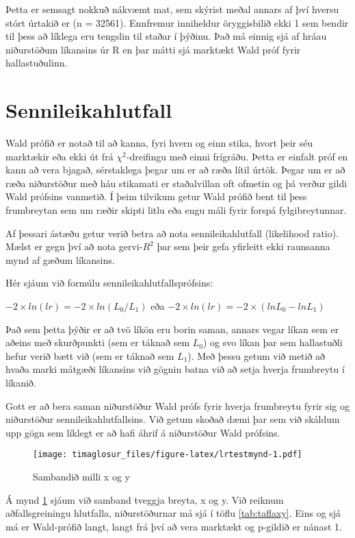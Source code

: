 \documentclass[]{book}
\begin{document}
Þetta er semsagt nokkuð nákvæmt mat, sem skýrist meðal annars af því hversu stórt úrtakið er (n = 32561). Ennfremur inniheldur öryggisbilið ekki 1 sem bendir til þess að líklega eru tengslin til staðar í þýðinu. Það má einnig sjá af hráau niðurstöðum líkansins úr R en þar mátti sjá marktækt Wald próf fyrir hallastuðulinn.

\hypertarget{sennileikahlutfall}{%
\section{Sennileikahlutfall}\label{sennileikahlutfall}}

Wald prófið er notað til að kanna, fyri hvern og einn stika, hvort þeir séu marktækir eða ekki út frá \(\chi^2\)-dreifingu með einni frígráðu. Þetta er einfalt próf en kann að vera bjagað, sérstaklega þegar um er að ræða lítil úrtök. Þegar um er að ræða niðurstöður með háu stikamati er staðalvillan oft ofmetin og þá verður gildi Wald prófsins vanmetið. Í þeim tilvikum getur Wald prófið bent til þess frumbreytan sem um ræðir skipti litlu eða engu máli fyrir forspá fylgibreytunnar.

Af þessari ástæðu getur verið betra að nota sennileikahlutfall (likelihood ratio). Mælst er gegn því að nota gervi-\(R^2\) þar sem þeir gefa yfirleitt ekki raunsanna mynd af gæðum líkansins.

Hér sjáum við formúlu sennileikahlutfallsprófsins:

\(-2 \times ln(lr) = -2\times ln({L_{0}}/{L_{1}} )\)
eða
\(-2 \times ln(lr) = -2\times (lnL_{0}-lnL_{1} )\)

Það sem þetta þýðir er að tvö líkön eru borin saman, annars vegar líkan sem er aðeins með skurðpunkti (sem er táknað sem \(L_0\)) og svo líkan þar sem hallastuðli hefur verið bætt við (sem er táknað sem \(L_1\)). Með þessu getum við metið að hvaða marki mátgæði líkansins við gögnin batna við að setja hverja frumbreytu í líkanið.

Gott er að bera saman niðurstöður Wald prófs fyrir hverja frumbreytu fyrir sig og niðurstöður sennileikahlutfallsins. Við getum skoðað dæmi þar sem við skáldum upp gögn sem líklegt er að hafi áhrif á niðurstöður Wald prófsins.

\begin{figure}
\centering
\texttt{[image: timaglosur\_files/figure-latex/lrtestmynd-1.pdf]}
\caption{\label{fig:lrtestmynd}Sambandið milli x og y}
\end{figure}

Á mynd \ref{fig:lrtestmynd} sjáum við samband tveggja breyta, x og y. Við reiknum aðfallsgreiningu hlutfalla, niðurstöðurnar má sjá í töflu \ref{tab:taflaxy}. Eins og sjá má er Wald-prófið langt, langt frá því að vera marktækt og p-gildið er nánast 1.
\end{document}
